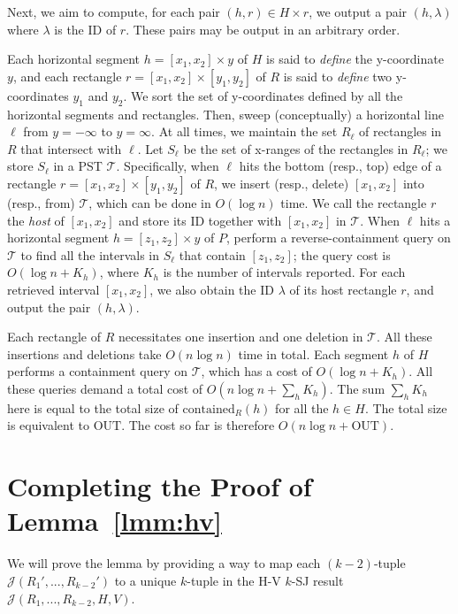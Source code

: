 \documentclass[sigconf]{acmart}
\def\vgap{\vspace{0mm}}
\def\extraspacing{\vspace{1.5mm} \noindent}
\def\J{\mathcal{J}}
\def\T{\mathcal{T}}
\def\contained{\mathrm{contained}}
\def\out{\mathrm{OUT}}
\begin{document}
{{{\vgap

Next, we aim to compute, for each pair $(h, r) \in H \times r$, we output a pair $(h, \lambda)$ where $\lambda$ is the ID of $r$. These pairs may be output in an arbitrary order.

\vgap

Each horizontal segment $h = [x_1, x_2] \times y$ of $H$ is said to {\em define} the y-coordinate $y$, and each rectangle $r = [x_1, x_2] \times [y_1, y_2]$ of $R$ is said to {\em define} two y-coordinates $y_1$ and $y_2$. We sort the set of y-coordinates defined by all the horizontal segments and rectangles. Then, sweep (conceptually) a horizontal line $\ell$ from $y = -\infty$ to $y = \infty$. At all times, we maintain the set $R_\ell$ of rectangles in $R$ that intersect with $\ell$. Let $S_\ell$ be the set of x-ranges of the rectangles in $R_\ell$; we store $S_\ell$ in a PST $\T$. Specifically, when $\ell$ hits the bottom (resp., top) edge of a rectangle $r = [x_1, x_2] \times [y_1, y_2]$ of $R$, we insert (resp., delete) $[x_1, x_2]$ into (resp., from) $\T$, which can be done in $O(\log n)$ time. We call the rectangle $r$ the {\em host} of $[x_1, x_2]$ and store its ID together with $[x_1, x_2]$ in $\T$. When $\ell$ hits a horizontal segment $h = [z_1, z_2] \times y$ of $P$, perform a reverse-containment query on $\T$ to find all the intervals in $S_\ell$ that contain $[z_1, z_2]$; the query cost is $O(\log n + K_h)$, where $K_h$ is the number of intervals reported. For each retrieved interval $[x_1, x_2]$, we also obtain the ID $\lambda$ of its host rectangle $r$, and output the pair $(h, \lambda)$.

\vgap

Each rectangle of $R$ necessitates one insertion and one deletion in $\T$. All these insertions and deletions take $O(n \log n)$ time in total. Each segment $h$ of $H$ performs a containment query on $\T$, which has a cost of $O(\log n + K_h)$. All these queries demand a total cost of $O(n \log n + \sum_h K_h)$. The sum $\sum_h K_h$ here is equal to the total size of $\contained_R(h)$ for all the $h \in H$. The total size is equivalent to $\out$. The cost so far is therefore $O(n \log n + \out)$.


\section{Completing the Proof of Lemma~\ref{lmm:hv}} \label{app:hv} 

\extraspacing {\bf Proof of Lemma~\ref{lmm:hv:type1:recur-output}.} We will prove the lemma by providing a way to map each $(k-2)$-tuple $\J(R_1',...,R_{k-2}')$ to a unique $k$-tuple in the H-V $k$-SJ result $\J(R_1,...,R_{k-2},H,V)$.

}}}
\end{document}
